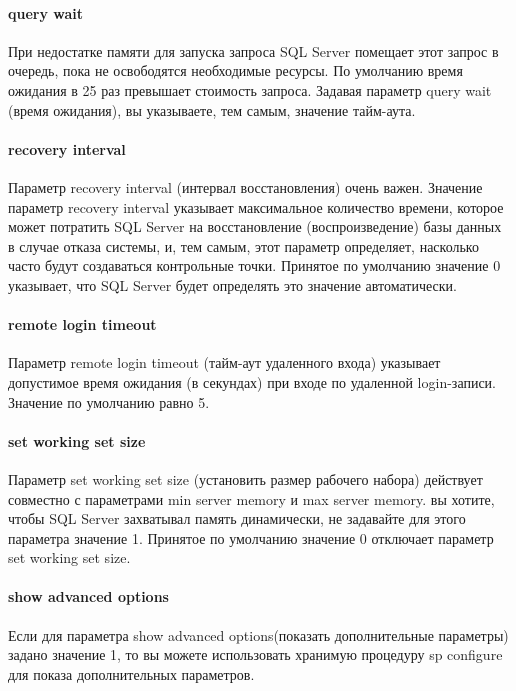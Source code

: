 \documentclass[russian,utf8,emptystyle]{eskdtext}
\begin{document}
\paragraph{query wait}

При недостатке памяти для запуска запроса SQL Server помещает этот запрос в очередь, пока не освободятся необходимые ресурсы. По умолчанию время ожидания в 25 раз превышает стоимость запроса. Задавая параметр query wait (время ожидания), вы указываете, тем самым, значение тайм-аута.

\paragraph{recovery interval}

Параметр recovery interval (интервал восстановления) очень важен. Значение параметр recovery interval указывает максимальное количество времени, которое может потратить SQL Server на восстановление (воспроизведение) базы данных в случае отказа системы, и, тем самым, этот параметр определяет, насколько часто будут создаваться контрольные точки. Принятое по умолчанию значение 0 указывает, что SQL Server будет определять это значение автоматически.

\paragraph{remote login timeout}

Параметр remote login timeout (тайм-аут удаленного входа) указывает допустимое время ожидания (в секундах) при входе по удаленной login-записи. Значение по умолчанию равно 5.

\paragraph{set working set size}

Параметр set working set size (установить размер рабочего набора) действует совместно с параметрами min server memory и max server memory. вы хотите, чтобы SQL Server захватывал память динамически, не задавайте для этого параметра значение 1. Принятое по умолчанию значение 0 отключает параметр set working set size.

\paragraph{show advanced options}

Если для параметра show advanced options(показать дополнительные параметры) задано значение 1, то вы можете использовать хранимую процедуру sp configure для показа дополнительных параметров.
\end{document}
